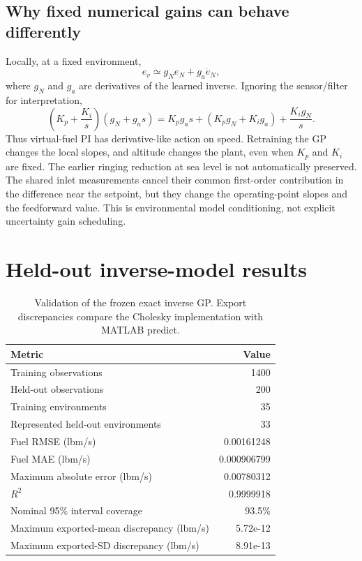 \documentclass[11pt,a4paper]{article}
\begin{document}
\subsection{Why fixed numerical gains can behave differently}
Locally, at a fixed environment,
\begin{equation}
e_v\simeq g_N e_N+g_a\dot e_N,
\end{equation}
where $g_N$ and $g_a$ are derivatives of the learned inverse. Ignoring the sensor/filter for interpretation,
\begin{equation}
\left(K_p+\frac{K_i}{s}\right)(g_N+g_as)
=K_pg_as+(K_pg_N+K_ig_a)+\frac{K_ig_N}{s}.
\end{equation}
Thus virtual-fuel PI has derivative-like action on speed. Retraining the GP changes the local slopes, and altitude changes the plant, even when $K_p$ and $K_i$ are fixed. The earlier ringing reduction at sea level is not automatically preserved. The shared inlet measurements cancel their common first-order contribution in the difference near the setpoint, but they change the operating-point slopes and the feedforward value. This is environmental model conditioning, not explicit uncertainty gain scheduling.

\section{Held-out inverse-model results}
\begin{table}[H]\centering\small
\setlength{\tabcolsep}{5pt}
\begin{tabular}{@{}lr@{}}\toprule
Metric & Value\\\midrule
Training observations & 1400\\
Held-out observations & 200\\
Training environments & 35\\
Represented held-out environments & 33\\
Fuel RMSE (lbm/s) & 0.00161248\\
Fuel MAE (lbm/s) & 0.000906799\\
Maximum absolute error (lbm/s) & 0.00780312\\
$R^2$ & 0.9999918\\
Nominal 95\% interval coverage & 93.5\%\\
Maximum exported-mean discrepancy (lbm/s) & 5.72e-12\\
Maximum exported-SD discrepancy (lbm/s) & 8.91e-13\\
\bottomrule\end{tabular}\caption{Validation of the frozen exact inverse GP. Export discrepancies compare the Cholesky implementation with MATLAB predict.}\end{table}
\end{document}
